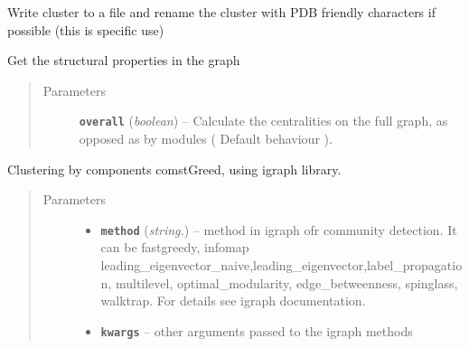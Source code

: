 \documentclass[letterpaper,10pt,english]{sphinxmanual}
\begin{document}
\begin{fulllineitems}
\begin{fulllineitems}
\end{fulllineitems}


\begin{fulllineitems}
\label{Doc:Moduler.GMgraph.Cluster2File}
Write cluster to a file and rename the cluster with PDB friendly characters if possible (this is specific use)

\end{fulllineitems}


\begin{fulllineitems}
\label{Doc:Moduler.GMgraph.Get_StructProps}
Get the structural properties in the graph
\begin{quote}\begin{description}
\item[{Parameters}] \leavevmode
\textbf{\texttt{overall}} (\emph{boolean}) -- Calculate the centralities on the full graph, as opposed as by modules ( Default behaviour ).

\end{description}\end{quote}

\end{fulllineitems}


\begin{fulllineitems}
\label{Doc:Moduler.GMgraph.Graph_Cluster}
Clustering by components comstGreed, using igraph library.
\begin{quote}\begin{description}
\item[{Parameters}] \leavevmode\begin{itemize}
\item {} 
\textbf{\texttt{method}} (\emph{string.}) -- method in igraph ofr community detection. It can be fastgreedy, infomap leading\_eigenvector\_naive,leading\_eigenvector,label\_propagation, multilevel, optimal\_modularity, edge\_betweenness, spinglass, walktrap. For details see igraph documentation.

\item {} 
\textbf{\texttt{kwargs}} -- other arguments passed to the igraph methods


\end{itemize}
\end{description}
\end{quote}
\end{fulllineitems}
\end{fulllineitems}
\end{document}
